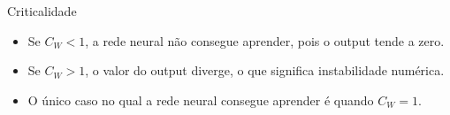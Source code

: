 \documentclass{beamer}
\newcommand{\EE}{\mathbb{E}}
\DeclareMathOperator{\Cov}{Cov}
\begin{document}
\begin{frame}{Criticalidade}
	\begin{itemize}
		\item Se $C_W < 1$, a rede neural não consegue aprender, pois o output tende a zero.
		\item Se $C_W > 1$, o valor do output diverge, o que significa instabilidade numérica.
		\item O único caso no qual a rede neural consegue aprender é quando $C_W = 1$.
	\end{itemize}
\end{frame}
	
\end{document}
